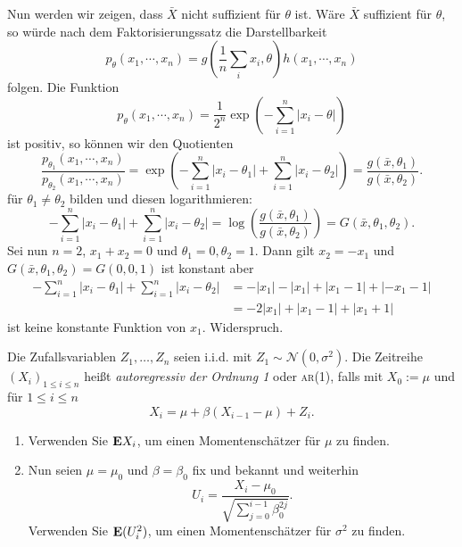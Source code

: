 Nun werden wir zeigen, dass $\bar X$ nicht suffizient für $\theta$ ist. Wäre $\bar X$ 
suffizient für $\theta$, so würde nach dem Faktorisierungssatz die Darstellbarkeit
\begin{equation*}
    p_{\theta}(x_1, \cdots, x_n) = g \left( \frac{1}{n} \sum_{i}^{} x_i, \theta \right) h(x_1, \cdots, x_n)
\end{equation*}
folgen. Die Funktion 
\begin{equation*}
    p_\theta(x_1, \cdots, x_n) = \frac{1}{2^n} \exp \left( - \sum_{i=1}^{n} |x_i - \theta | \right)
\end{equation*}
ist positiv, so können wir den Quotienten 
\begin{equation*}
    \frac{p_{\theta_1}(x_1, \cdots, x_n)}{p_{\theta_2}(x_1, \cdots, x_n)} = 
    \exp \left( - \sum_{i=1}^{n} | x_i - \theta_1 | + \sum_{i=1}^{n} |x_i - \theta_2 | \right) 
    = \frac{g(\bar x,\theta_1) }{ g(\bar x, \theta_2)}. 
\end{equation*}
für $\theta_1 \neq \theta_2$ bilden und diesen logarithmieren:
\begin{equation*}
    - \sum_{i=1}^{n} | x_i - \theta_1 | + \sum_{i=1}^{n} |x_i - \theta_2 | 
    = \log \left( \frac{g(\bar x, \theta_1)}{g(\bar x, \theta_2)} \right) = G(\bar x, \theta_1, \theta_2). 
\end{equation*}
Sei nun $n=2$, $x_1 + x_2 = 0$ und $\theta_1=0, \theta_2 = 1$. Dann gilt $x_2=-x_1$ und 
$G(\bar x, \theta_1, \theta_2)= G(0, 0, 1)$ ist konstant aber 
\begin{align*}
    - \sum_{i=1}^{n} | x_i - \theta_1 | + \sum_{i=1}^{n} |x_i - \theta_2 | 
    &= -|x_1| - |x_1| + |x_1-1| + |-x_1-1| \\
    &= -2 |x_1| + |x_1-1| + |x_1+1|
\end{align*}
ist keine konstante Funktion von $x_1$. Widerspruch.


  Die Zufallsvariablen $Z_1,\ldots, Z_n$ seien i.i.d. 
mit $Z_1 \sim \mathcal N(0,\sigma^2)$. Die Zeitreihe $\left( X_i \right)_{1\leq i\leq n}$
heißt \emph{autoregressiv der Ordnung 1} oder \textsc{ar(1)}, falls mit $X_0:= \mu$
und für $1\leq i \leq n$ 
\begin{equation*}
	X_i = \mu + \beta(X_{i-1} - \mu) + Z_i.
\end{equation*}
\begin{enumerate}
	\item Verwenden Sie $\mathbf{E} X_i$, um einen Momentenschätzer für $\mu$ zu finden. 
	\item Nun seien $\mu= \mu_0$ und $\beta=\beta_0$ fix und bekannt und weiterhin
		\begin{equation*}
			U_i = \frac{X_i - \mu_0}{ \sqrt{ \sum_{j=0}^{i-1} \beta^{2j}_0 }}.
		\end{equation*}
		Verwenden Sie $\mathbf{E} (U_i^2)$, um einen Momentenschätzer für $\sigma^2$ zu finden.
\end{enumerate}

